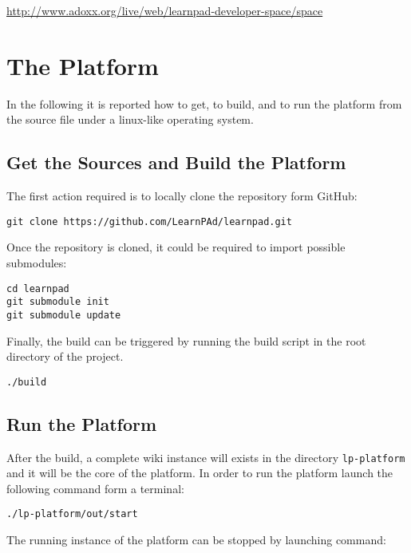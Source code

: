 \documentclass{learnpad}
\begin{document}
\url{http://www.adoxx.org/live/web/learnpad-developer-space/space}


\section{The Platform}
\label{sec:platform}

In the following it is reported how to get, to build, and to
run the \learnpad platform from the source file under a linux-like
operating system.

\subsection{Get the Sources and Build the Platform}
\label{sec:build}

The first action required is to locally clone the \learnpad
repository form GitHub:

\begin{lstlisting}[style=javaCode, breaklines]
git clone https://github.com/LearnPAd/learnpad.git
\end{lstlisting}

Once the repository is cloned, it could be required to import 
possible submodules:

\begin{lstlisting}[style=javaCode, breaklines]
cd learnpad
git submodule init
git submodule update
\end{lstlisting}

Finally, the build can be triggered by running the build script in the 
root directory of the project.

\begin{lstlisting}[style=javaCode, breaklines]
./build
\end{lstlisting}

\subsection{Run the Platform}
\label{sec:run}

After the build, a complete wiki instance will exists in the directory 
\texttt{lp-platform} and it will be the core of the platform. In order to run
the platform launch the following command form a terminal:

\begin{lstlisting}[style=javaCode, breaklines]
./lp-platform/out/start
\end{lstlisting}

The running instance of the platform can be stopped by launching command:
\end{document}
